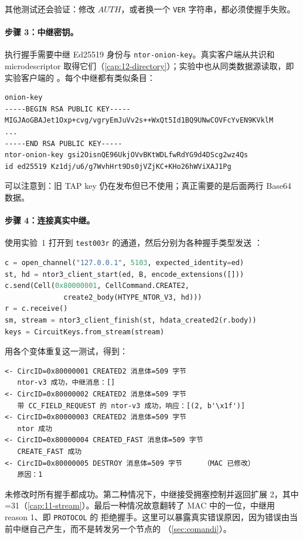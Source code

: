 其他测试还会验证：修改 $\mathit{AUTH}$，或者换一个 \texttt{VER} 字符串，都必须使握手失败。

\paragraph{步骤 3：中继密钥。} 执行握手需要中继 Ed25519 身份与 \texttt{ntor-onion-key}。真实客户端从共识和 microdescriptor 取得它们（\cref{cap:12-directory}）；实验中也从同类数据源读取，即实验客户端的 。每个中继都有类似条目：

\begin{lstlisting}[numbers=none]
onion-key
-----BEGIN RSA PUBLIC KEY-----
MIGJAoGBAJet1Oxp+cvg/vgryEmJuVv2s++WxQt5Id1BQ9UNwCOVFcYvEN9KVklM
...
-----END RSA PUBLIC KEY-----
ntor-onion-key gsi2OisnQE96UkjOVvBKtWDLfwRdYG9d4DScg2wz4Qs
id ed25519 Kz1dj/u6/g7WvhHrt9Ds0jVZjKC+KHo26hWViXAJ1Pg
\end{lstlisting}

可以注意到：旧 TAP key 仍在发布但已不使用；真正需要的是后面两行 Base64 数据。

\paragraph{步骤 4：连接真实中继。} 使用实验~1 打开到 \texttt{test003r} 的通道，然后分别为各种握手类型发送 ：

\begin{lstlisting}[language=Python]
c = open_channel("127.0.0.1", 5103, expected_identity=ed)
st, hd = ntor3_client_start(ed, B, encode_extensions([]))
c.send(Cell(0x80000001, CellCommand.CREATE2,
              create2_body(HTYPE_NTOR_V3, hd)))
r = c.receive()
sm, stream = ntor3_client_finish(st, hdata_created2(r.body))
keys = CircuitKeys.from_stream(stream)
\end{lstlisting}

用各个变体重复这一测试，得到：

\begin{lstlisting}[numbers=none]
<- CircID=0x80000001 CREATED2 消息体=509 字节
   ntor-v3 成功，中继消息：[]
<- CircID=0x80000002 CREATED2 消息体=509 字节
   带 CC_FIELD_REQUEST 的 ntor-v3 成功，响应：[(2, b'\x1f')]
<- CircID=0x80000003 CREATED2 消息体=509 字节
   ntor 成功
<- CircID=0x80000004 CREATED_FAST 消息体=509 字节
   CREATE_FAST 成功
<- CircID=0x80000005 DESTROY 消息体=509 字节     （MAC 已修改）
   原因：1
\end{lstlisting}

未修改时所有握手都成功。第二种情况下，中继接受拥塞控制并返回扩展 2，其中 =31（\cref{cap:11-stream}）。最后一种情况故意翻转了 MAC 中的一位，中继用 reason 1、即 \texttt{PROTOCOL} 的  拒绝握手。这里可以暴露真实错误原因，因为错误由当前中继自己产生，而不是转发另一个节点的 （\cref{sec:comandi}）。

